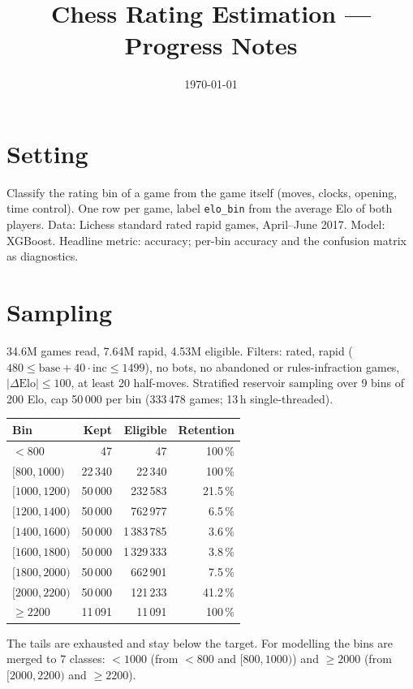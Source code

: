 \documentclass[11pt,a4paper]{article}
\title{Chess Rating Estimation --- Progress Notes}
\author{}
\date{\today}
\begin{document}
\maketitle

\section{Setting}
Classify the rating bin of a game from the game itself (moves, clocks, opening,
time control). One row per game, label \texttt{elo\_bin} from the average Elo of
both players. Data: Lichess standard rated rapid games, April--June 2017.
Model: XGBoost. Headline metric: accuracy; per-bin accuracy and the confusion
matrix as diagnostics.

\section{Sampling}
34.6M games read, 7.64M rapid, 4.53M eligible. Filters: rated, rapid
($480 \le \text{base} + 40\cdot\text{inc} \le 1499$), no bots, no abandoned or
rules-infraction games, $|\Delta\text{Elo}| \le 100$, at least 20 half-moves.
Stratified reservoir sampling over 9 bins of 200 Elo, cap 50\,000 per bin
(333\,478 games; 13\,h single-threaded).

\begin{center}
\begin{tabular}{lrrr}
\toprule
Bin & Kept & Eligible & Retention \\
\midrule
$<800$        & 47      & 47        & 100\,\% \\
$[800,1000)$  & 22\,340 & 22\,340   & 100\,\% \\
$[1000,1200)$ & 50\,000 & 232\,583  & 21.5\,\% \\
$[1200,1400)$ & 50\,000 & 762\,977  & 6.5\,\% \\
$[1400,1600)$ & 50\,000 & 1\,383\,785 & 3.6\,\% \\
$[1600,1800)$ & 50\,000 & 1\,329\,333 & 3.8\,\% \\
$[1800,2000)$ & 50\,000 & 662\,901  & 7.5\,\% \\
$[2000,2200)$ & 50\,000 & 121\,233  & 41.2\,\% \\
$\ge 2200$    & 11\,091 & 11\,091   & 100\,\% \\
\bottomrule
\end{tabular}
\end{center}

The tails are exhausted and stay below the target. For modelling the bins are
merged to 7 classes: $<1000$ (from $<800$ and $[800,1000)$) and $\ge 2000$
(from $[2000,2200)$ and $\ge 2200$).
\end{document}
